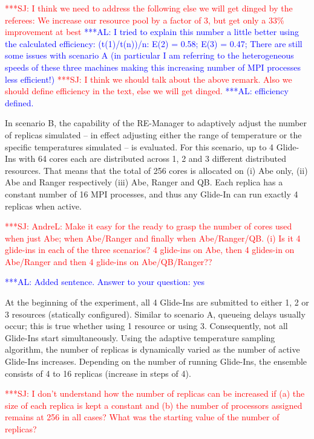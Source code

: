 \documentclass{rspublic}
\newcommand{\alnote}[1]{ {\textcolor{blue} { ***AL: #1 }}}
\newcommand{\jhanote}[1]{ {\textcolor{red} { ***SJ: #1 }}}
\newcommand{\alnote}[1]{}
\newcommand{\jhanote}[1]{}
\begin{document}
\jhanote{I think we need to address
  the following else we will get dinged by the referees: We increase
  our resource pool by a factor of 3, but get only a 33\% improvement
  at best} \alnote{I tried to explain this number a little better
  using the calculated efficiency: (t(1)/t(n))/n: E(2) = 0.58; E(3) =
  0.47; There are still some issues with scenario A (in particular I
  am referring to the heterogeneous speeds of these three machines
  making this increasing number of MPI processes less efficient!)}
\jhanote{I think we should talk about the above remark. Also we should
  define efficiency in the text, else we will get dinged.}  
\alnote{efficiency defined.}

In scenario B, the capability of the RE-Manager to adaptively adjust
the number of replicas simulated -- in effect adjusting either the
range of temperature or the specific temperatures simulated -- is
evaluated. 
For this scenario, up to 4 Glide-Ins with 64 cores each are
distributed across 1, 2 and 3 different distributed resources. That
means that the total of 256 cores is allocated on (i) Abe only, (ii)
Abe and Ranger respectively (iii) Abe, Ranger and QB.  Each replica
has a constant number of 16 MPI processes, and thus any Glide-In can
run exactly 4 replicas when active.

\jhanote{AndreL: Make it easy for the ready to grasp the number of
  cores used when just Abe; when Abe/Ranger and finally when
  Abe/Ranger/QB. (i) Is it 4 glide-ins in each of the three scenarios?
  4 glide-ins on Abe, then 4 glides-in on Abe/Ranger and then 4
  glide-ins on Abe/QB/Ranger??}

\alnote{Added sentence. Answer to your question: yes}
              
At the beginning of the experiment, all 4 Glide-Ins are submitted to
either 1, 2 or 3 resources (statically configured).  Similar to
scenario A, queueing delays usually occur; this is true whether using
1 resource or using 3.  Consequently, not all Glide-Ins start
simultaneously.  Using the adaptive temperature sampling algorithm,
the number of replicas is dynamically varied as the number of active
Glide-Ins increases. Depending on the number of running Glide-Ins, the
ensemble consists of 4 to 16 replicas (increase in
steps of 4).

\jhanote{I don't understand how the number of replicas can be
  increased if (a) the size of each replica is kept a constant and (b)
  the number of processors assigned remains at 256 in all cases? What
  was the starting value of the number of replicas?}  
\end{document}
